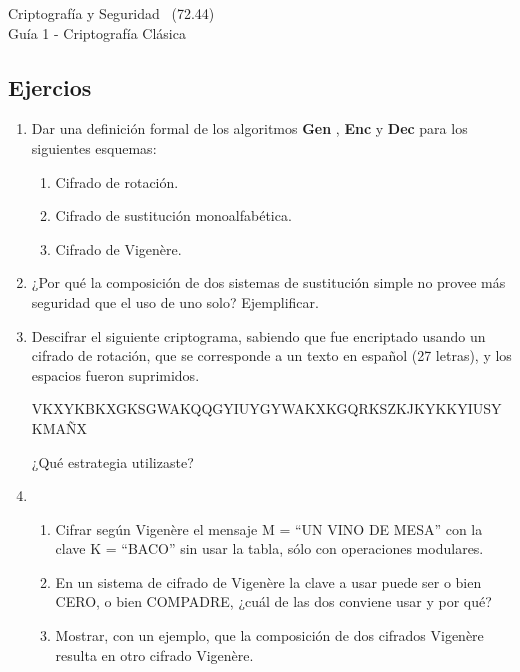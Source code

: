 \documentclass[]{book}
\theoremstyle{definition}
\begin{document}
\begin{center}
  {\Large Criptografía y Seguridad \the\year~(72.44)\\[.2cm]
Guía 1 - Criptografía Clásica}\\
\end{center}

\vspace{0.2 cm}


\subsection*{Ejercios}
\begin{enumerate}
\item\label{norms}
  Dar una definición formal de los algoritmos \textbf{Gen} , \textbf{Enc} y
  \textbf{Dec} para los siguientes esquemas: 
\begin{enumerate}
  \item Cifrado de rotación.
  \item Cifrado de sustitución monoalfabética.
  \item Cifrado de Vigenère.
\end{enumerate}

\item ¿Por qué la composición de dos sistemas de sustitución simple no provee más seguridad que el uso de uno solo? Ejemplificar. 

\item Descifrar el siguiente criptograma, sabiendo que fue encriptado usando un
  cifrado de rotación, que se corresponde a un texto en español (27 letras), y
  los espacios fueron suprimidos.
  
\begin{center}
VKXYKBKXGKSGWAKQQGYIUYGYWAKXKGQRKSZKJKYKKYIUSYKMAÑX
\end{center}
¿Qué estrategia utilizaste? 

\item 
  \begin{enumerate}
    \item Cifrar según Vigenère el mensaje M = ``UN VINO DE MESA'' con la clave
      K = ``BACO'' sin usar la tabla, sólo con operaciones modulares.
    \item En un sistema de cifrado de Vigenère la clave a usar puede ser o bien CERO, o bien COMPADRE, ¿cuál de las dos conviene usar y por qué?
    \item Mostrar, con un ejemplo, que la composición de dos cifrados Vigenère resulta en otro cifrado Vigenère.
  \end{enumerate}


\end{enumerate}
\end{document}
